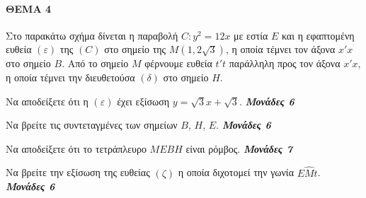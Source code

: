 \documentclass[11pt,a4paper,twoside]{book}
\newcommand{\monades}[1]{
\hspace*{\fill}
\textbf{\textit{\textcolor{maincolor}{Μονάδες #1}}}}
\begin{document}
\vspace{4mm}

\paragraph{\textbf{ΘΕΜΑ 4}}

Στο παρακάτω σχήμα δίνεται η παραβολή $C: y^2 = 12x$ με εστία $E$ και η εφαπτομένη ευθεία $(\varepsilon)$ της $(C)$ στο σημείο της $M(1,2\sqrt{3})$, η οποία τέμνει τον άξονα $x'x$ στο σημείο $B$. Από το σημείο $M$ φέρνουμε ευθεία $t't$ παράλληλη προς τον άξονα $x'x$, η οποία τέμνει την διευθετούσα $(\delta)$ στο σημείο $H$.

\begin{alist}    \item Να αποδείξετε ότι η $(\varepsilon)$ έχει εξίσωση $y = \sqrt{3}x + \sqrt{3}$. \monades{6}
    \item Να βρείτε τις συντεταγμένες των σημείων $B$, $H$, $E$. \monades{6}
    \item Να αποδείξετε ότι το τετράπλευρο $MEBH$ είναι ρόμβος. \monades{7}
    \item Να βρείτε την εξίσωση της ευθείας $(\zeta)$ η οποία διχοτομεί την γωνία $E\hat{M}t$. \monades{6}\end{alist}
\end{document}
